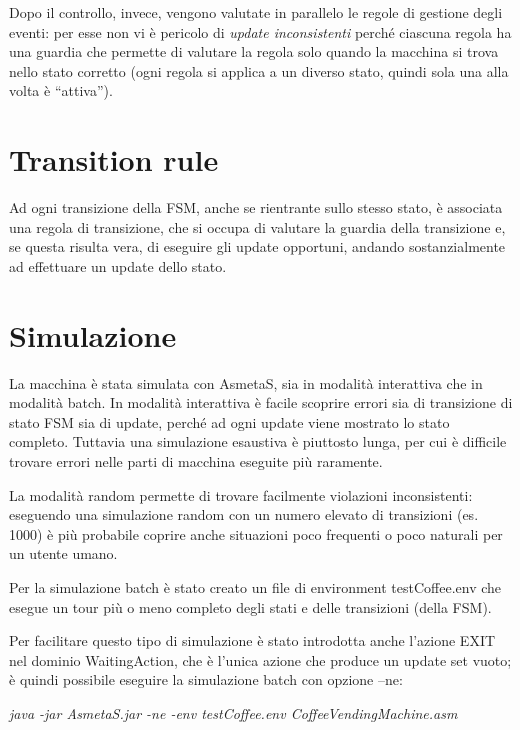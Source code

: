 Dopo il controllo, invece, vengono valutate in parallelo le regole di gestione degli eventi: per esse non vi è pericolo di \textit{update inconsistenti} perché ciascuna regola ha una guardia che permette di valutare la regola solo quando la macchina si trova nello stato corretto (ogni regola si applica a un diverso stato, quindi sola una alla volta è “attiva”).

\section{Transition rule}
Ad ogni transizione della FSM, anche se rientrante sullo stesso stato, è associata una regola di transizione, che si occupa di valutare la guardia della transizione e, se questa risulta vera, di eseguire gli update opportuni, andando sostanzialmente ad effettuare un update dello stato.


\section{Simulazione}
La macchina è stata simulata con AsmetaS, sia in modalità interattiva che in modalità batch.
In modalità interattiva è facile scoprire errori sia di transizione di stato FSM sia di update, perché ad ogni update viene mostrato lo stato completo. Tuttavia una simulazione esaustiva è piuttosto lunga, per cui è difficile trovare errori nelle parti di macchina eseguite più raramente.

La modalità random permette di trovare facilmente violazioni inconsistenti: eseguendo una simulazione random con un numero elevato di transizioni (es. 1000) è più probabile coprire anche situazioni poco frequenti o poco naturali per un utente umano.

Per la simulazione batch è stato creato un file di environment testCoffee.env che esegue un tour più o meno completo degli stati e delle transizioni (della FSM).

Per facilitare questo tipo di simulazione è stato introdotta anche l’azione EXIT nel dominio WaitingAction, che è l’unica azione che produce un update set vuoto; è quindi possibile eseguire la simulazione batch con opzione –ne:

\textit{java -jar AsmetaS.jar -ne -env testCoffee.env CoffeeVendingMachine.asm}

